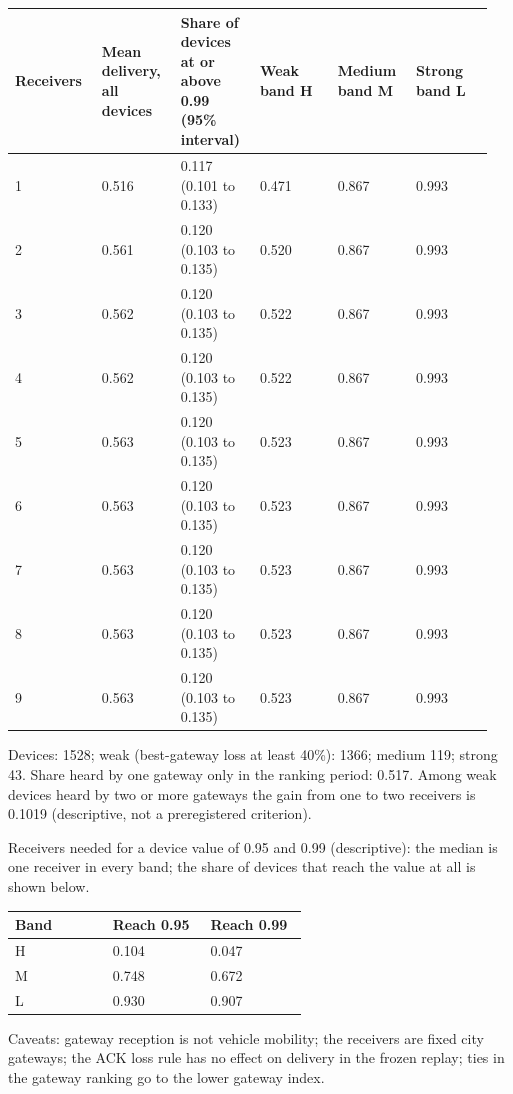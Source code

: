 {\scriptsize\raggedright
\begin{longtable}{p{0.158\linewidth}p{0.158\linewidth}p{0.158\linewidth}p{0.158\linewidth}p{0.158\linewidth}p{0.158\linewidth}}
\toprule
Receivers & Mean delivery, all devices & Share of devices at or above 0.99 (95\% interval) & Weak band H & Medium band M & Strong band L \\
\midrule
\endhead
1 & 0.516 & 0.117 (0.101 to 0.133) & 0.471 & 0.867 & 0.993 \\
2 & 0.561 & 0.120 (0.103 to 0.135) & 0.520 & 0.867 & 0.993 \\
3 & 0.562 & 0.120 (0.103 to 0.135) & 0.522 & 0.867 & 0.993 \\
4 & 0.562 & 0.120 (0.103 to 0.135) & 0.522 & 0.867 & 0.993 \\
5 & 0.563 & 0.120 (0.103 to 0.135) & 0.523 & 0.867 & 0.993 \\
6 & 0.563 & 0.120 (0.103 to 0.135) & 0.523 & 0.867 & 0.993 \\
7 & 0.563 & 0.120 (0.103 to 0.135) & 0.523 & 0.867 & 0.993 \\
8 & 0.563 & 0.120 (0.103 to 0.135) & 0.523 & 0.867 & 0.993 \\
9 & 0.563 & 0.120 (0.103 to 0.135) & 0.523 & 0.867 & 0.993 \\
\bottomrule
\end{longtable}}

Devices: 1528; weak (best-gateway loss at least 40\%): 1366; medium 119; strong 43. Share heard by one gateway only in the ranking period: 0.517. Among weak devices heard by two or more gateways the gain from one to two receivers is 0.1019 (descriptive, not a preregistered criterion).

Receivers needed for a device value of 0.95 and 0.99 (descriptive): the median is one receiver in every band; the share of devices that reach the value at all is shown below.

{\scriptsize\raggedright
\begin{longtable}{p{0.317\linewidth}p{0.317\linewidth}p{0.317\linewidth}}
\toprule
Band & Reach 0.95 & Reach 0.99 \\
\midrule
\endhead
H & 0.104 & 0.047 \\
M & 0.748 & 0.672 \\
L & 0.930 & 0.907 \\
\bottomrule
\end{longtable}}

Caveats: gateway reception is not vehicle mobility; the receivers are fixed city gateways; the ACK loss rule has no effect on delivery in the frozen replay; ties in the gateway ranking go to the lower gateway index.

